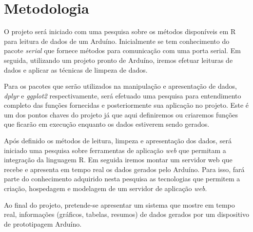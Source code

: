 \chapter[Metodologia]{Metodologia}

O projeto será iniciado com uma pesquisa sobre os métodos disponíveis em R para 
leitura de dados de um Arduíno. Inicialmente se tem conhecimento do pacote 
\emph{serial} \cite{Seilmayer2017} que fornece métodos para comunicação com uma porta serial. Em seguida, 
utilizando um projeto pronto de Arduíno, iremos efetuar leituras de dados e 
aplicar as técnicas de limpeza de dados. 

Para os pacotes que serão utilizados na manipulação e apresentação de dados, 
\emph{dplyr} e \emph{ggplot2} respectivamente, será efetuado uma pesquisa para 
entendimento completo das funções fornecidas e posteriormente sua aplicação no 
projeto. Este é um dos pontos chaves do projeto já que aqui definiremos ou 
criaremos funções que ficarão em execução enquanto os dados estiverem sendo 
gerados.

Após definido os métodos de leitura, limpeza e apresentação dos dados, será 
iniciado uma pesquisa sobre ferramentas de aplicação \emph{web} que permitam a 
integração da linguagem R. Em seguida iremos montar um servidor web que recebe e 
apresenta em tempo real os dados gerados pelo Arduíno. Para isso, fará parte do 
conhecimento adquirido nesta pesquisa as tecnologias que permitem a criação, 
hospedagem e modelagem de um servidor de aplicação \emph{web}.

Ao final do projeto, pretende-se apresentar um sistema que mostre em tempo real, 
informações (gráficos, tabelas, resumos) de dados gerados por um dispositivo de 
prototipagem Arduíno.
